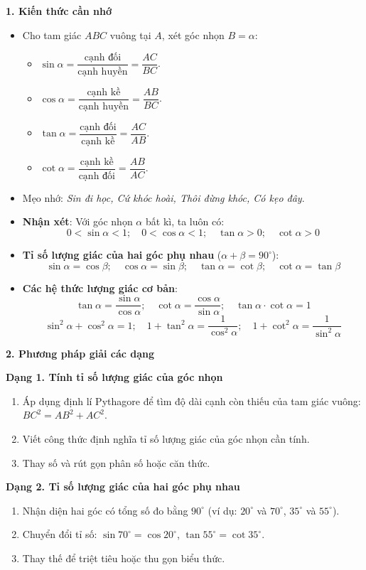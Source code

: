 \textbf{1. Kiến thức cần nhớ}
\begin{itemize}
\item Cho tam giác $ABC$ vuông tại $A$, xét góc nhọn $B = \alpha$:
\begin{itemize}
\item $\sin \alpha = \dfrac{\text{cạnh đối}}{\text{cạnh huyền}} = \dfrac{AC}{BC}$.
\item $\cos \alpha = \dfrac{\text{cạnh kề}}{\text{cạnh huyền}} = \dfrac{AB}{BC}$.
\item $\tan \alpha = \dfrac{\text{cạnh đối}}{\text{cạnh kề}} = \dfrac{AC}{AB}$.
\item $\cot \alpha = \dfrac{\text{cạnh kề}}{\text{cạnh đối}} = \dfrac{AB}{AC}$.
\end{itemize}
\item Mẹo nhớ: \textit{Sin đi học, Cứ khóc hoài, Thôi đừng khóc, Có kẹo đây}.
\item \textbf{Nhận xét}: Với góc nhọn $\alpha$ bất kì, ta luôn có:
$$\boxed{0 < \sin \alpha < 1;\quad 0 < \cos \alpha < 1;\quad \tan \alpha > 0;\quad \cot \alpha > 0}$$
\item \textbf{Tỉ số lượng giác của hai góc phụ nhau} ($\alpha + \beta = 90^\circ$):
$$\boxed{\sin \alpha = \cos \beta;\quad \cos \alpha = \sin \beta;\quad \tan \alpha = \cot \beta;\quad \cot \alpha = \tan \beta}$$
\item \textbf{Các hệ thức lượng giác cơ bản}:
$$\boxed{\tan \alpha = \dfrac{\sin \alpha}{\cos \alpha}};\quad \boxed{\cot \alpha = \dfrac{\cos \alpha}{\sin \alpha}};\quad \boxed{\tan \alpha \cdot \cot \alpha = 1}$$
$$\boxed{\sin^2 \alpha + \cos^2 \alpha = 1};\quad \boxed{1 + \tan^2 \alpha = \dfrac{1}{\cos^2 \alpha}};\quad \boxed{1 + \cot^2 \alpha = \dfrac{1}{\sin^2 \alpha}}$$
\end{itemize}

\textbf{2. Phương pháp giải các dạng}

\textbf{Dạng 1. Tính tỉ số lượng giác của góc nhọn}
\begin{enumerate}
\item Áp dụng định lí Pythagore để tìm độ dài cạnh còn thiếu của tam giác vuông: $BC^2 = AB^2 + AC^2$.
\item Viết công thức định nghĩa tỉ số lượng giác của góc nhọn cần tính.
\item Thay số và rút gọn phân số hoặc căn thức.
\end{enumerate}

\textbf{Dạng 2. Tỉ số lượng giác của hai góc phụ nhau}
\begin{enumerate}
\item Nhận diện hai góc có tổng số đo bằng $90^\circ$ (ví dụ: $20^\circ$ và $70^\circ$, $35^\circ$ và $55^\circ$).
\item Chuyển đổi tỉ số: $\sin 70^\circ = \cos 20^\circ$, $\tan 55^\circ = \cot 35^\circ$.
\item Thay thế để triệt tiêu hoặc thu gọn biểu thức.
\end{enumerate}

